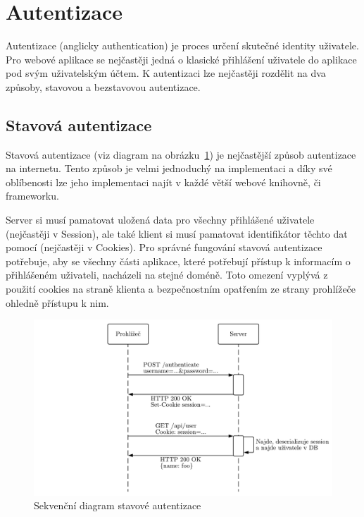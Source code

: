 
\section{Autentizace}\label{sec:autentizace}

Autentizace (anglicky authentication) je proces určení skutečné identity uživatele.
Pro webové aplikace se nejčastěji jedná o klasické přihlášení uživatele do aplikace pod svým uživatelským účtem.
K autentizaci lze nejčastěji rozdělit na dva způsoby, stavovou a bezstavovou autentizace.

\subsection{Stavová autentizace}\label{subsec:stavováAutentizace}
Stavová autentizace (viz diagram na obrázku~\ref{fig:statefullAuthentication}) je nejčastější způsob autentizace na internetu.
Tento způsob je velmi jednoduchý na implementaci a díky své oblíbenosti lze jeho implementaci najít v každé větší webové knihovně, či frameworku.

Server si musí pamatovat uložená data pro všechny přihlášené uživatele (nejčastěji v Session), ale také klient si musí pamatovat identifikátor těchto dat pomocí (nejčastěji v Cookies).
Pro správné fungování stavová autentizace potřebuje, aby se všechny části aplikace, které potřebují přístup k informacím o přihlášeném uživateli, nacházeli na stejné doméně.
Toto omezení vyplývá z použití cookies na straně klienta a bezpečnostním opatřením ze strany prohlížeče ohledně přístupu k nim.

\begin{figure}[ht!]
    \centering
    \includegraphics[width=\textwidth]{partials/navrh/statefullAuthentication.pdf}
    \caption{Sekvenční diagram stavové autentizace}\label{fig:statefullAuthentication}
\end{figure}

